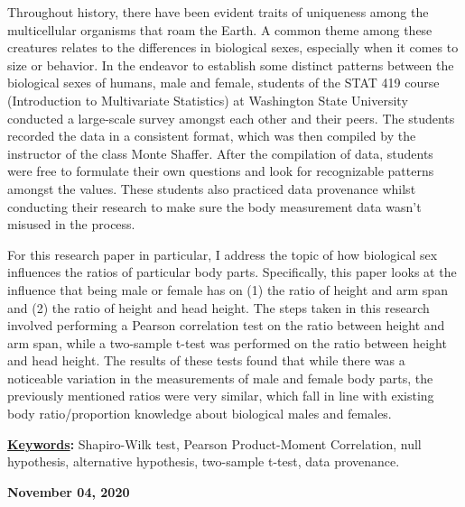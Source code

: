 \documentclass[]{article}
\renewenvironment{abstract}
 {{%
    \setlength{\leftmargin}{0mm}
    \setlength{\rightmargin}{\leftmargin}%
  }%
  \relax}
 {\endlist}
\begin{document}
\begin{abstract}

    \hbox{\vrule height .2pt width 39.14pc}

    \vskip 8.5pt %

\noindent Throughout history, there have been evident traits of
uniqueness among the multicellular organisms that roam the Earth. A
common theme among these creatures relates to the differences in
biological sexes, especially when it comes to size or behavior. In the
endeavor to establish some distinct patterns between the biological
sexes of humans, male and female, students of the STAT 419 course
(Introduction to Multivariate Statistics) at Washington State University
conducted a large-scale survey amongst each other and their peers. The
students recorded the data in a consistent format, which was then
compiled by the instructor of the class Monte Shaffer. After the
compilation of data, students were free to formulate their own questions
and look for recognizable patterns amongst the values. These students
also practiced data provenance whilst conducting their research to make
sure the body measurement data wasn't misused in the process.

\vspace{0.25cm}

For this research paper in particular, I address the topic of how
biological sex influences the ratios of particular body parts.
Specifically, this paper looks at the influence that being male or
female has on (1) the ratio of height and arm span and (2) the ratio of
height and head height. The steps taken in this research involved
performing a Pearson correlation test on the ratio between height and
arm span, while a two-sample t-test was performed on the ratio between
height and head height. The results of these tests found that while
there was a noticeable variation in the measurements of male and female
body parts, the previously mentioned ratios were very similar, which
fall in line with existing body ratio/proportion knowledge about
biological males and females.


\vskip 8.5pt \noindent \textbf{\underline{Keywords}:} Shapiro-Wilk test,
Pearson Product-Moment Correlation, null hypothesis, alternative
hypothesis, two-sample t-test, data provenance. \par

    




    
    \hbox{\vrule height .2pt width 39.14pc}
    \vskip 5pt 
    \hfill \textbf{\textcolor{WSU.gray}{ November 04, 2020 } }
    \vskip 5pt 
    
\end{abstract}
\end{document}
